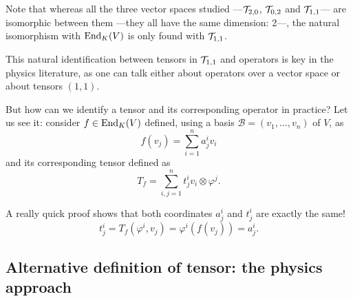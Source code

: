 Note that whereas all the three vector spaces studied ---${\mathcal T}_{2,0}$, ${\mathcal T}_{0,2}$ and ${\mathcal T}_{1,1}$--- are isomorphic between them ---they all have the same dimension: 2---, the natural isomorphism with $\operatorname{End}_K(V)$ is only found with ${\mathcal T}_{1,1}$.

\begin{remark}
	This natural identification between tensors in ${\mathcal T}_{1,1}$ and operators is key in the physics literature, as one can talk either about operators over a vector space or about tensors $(1,1)$.

	But how can we identify a tensor and its corresponding operator in practice? Let us see it: consider $f \in \operatorname{End}_K(V)$ defined, using a basis $\mathcal{B} = (v_1, \dots, v_n)$ of $V$, as
	\[
		f(v_j) = \sum_{i=1}^n a^i_j v_i
	\]
	and its corresponding tensor defined as
	\[
		T_f = \sum_{i,j=1}^n t^i_j v_i \otimes \varphi^j.
	\]

	A really quick proof shows that both coordinates $a^i_j$ and $t^i_j$ are exactly the same!
	\[
		t^i_j = T_f(\varphi^i, v_j) = \varphi^i(f(v_j)) = a^i_j.
	\]
\end{remark}

\subsection{Alternative definition of tensor: the physics approach}


